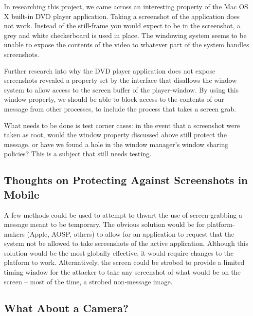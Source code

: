 \documentclass[11pt, a4paper,titlepage]{report}
\begin{document}
In researching this project, we came across an interesting property of the Mac OS X built-in DVD player application. Taking a screenshot of the application does not work. Instead of the still-frame you would expect to be in the screenshot, a grey and white checkerboard %
is used in place. The windowing system seems to be unable to expose the contents of the video to whatever part of the system handles screenshots.

Further research into why the DVD player application does not expose screenshots revealed a property set by the interface that disallows the window system to allow access to the screen buffer of the player-window. %
By using this window property, we should be able to block access to the contents of our message from other processes, to include the process that takes a screen grab.

What needs to be done is test corner cases: in the event that a screenshot were taken as root, would the window property discussed above still protect the message, or have we found a hole in the window manager's window sharing policies? This is a subject that still needs testing. 

\subsection*{Thoughts on Protecting Against Screenshots in Mobile} 
A few methods could be used to attempt to thwart the use of screen-grabbing a message meant to be temporary. The obvious solution would be for platform-makers (Apple, AOSP, others) to allow for an application to request that the system not be allowed to take screenshots of the active application. Although this solution would be the most globally effective, it would require changes to the platform to work. Alternatively, the screen could be strobed to provide a limited timing window for the attacker to take any screenshot of what would be on the screen -- most of the time, a strobed non-message image.

\subsection*{What About a Camera?}
\end{document}
